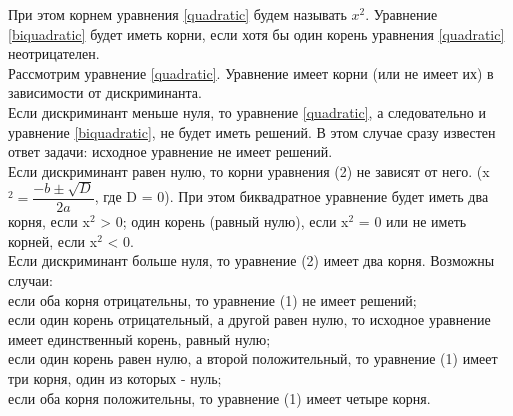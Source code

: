 \documentclass[12pt,a4paper]{report}
\begin{document}
При этом корнем уравнения \ref{quadratic} будем называть $x^{2}$.
Уравнение \ref{biquadratic} будет иметь корни, если хотя бы один корень уравнения \ref{quadratic} неотрицателен. \\
Рассмотрим уравнение \ref{quadratic}. Уравнение имеет корни (или не имеет их) в зависимости от дискриминанта. \\
Если дискриминант меньше нуля, то уравнение \ref{quadratic}, а следовательно и уравнение \ref{biquadratic}, не будет иметь решений. В этом случае сразу известен ответ задачи: исходное уравнение не имеет решений. \\
Если дискриминант равен нулю, то корни уравнения (2) не зависят от него. (x$^{2} = \dfrac{-b \pm \sqrt{D}}{2a}$, где D = 0). При этом биквадратное уравнение будет иметь два корня, если x$^{2}$ > 0; один корень (равный нулю), если x$^{2}$ = 0 или не иметь корней, если x$^{2}$ < 0. \\ 
Если дискриминант больше нуля, то уравнение (2) имеет два корня. Возможны случаи: \\
если оба корня отрицательны, то уравнение (1) не имеет решений; \\
если один корень отрицательный, а другой равен нулю, то исходное уравнение имеет единственный корень, равный нулю; \\
если один корень равен нулю, а второй положительный, то уравнение (1) имеет три корня, один из которых - нуль; \\
если оба корня положительны, то уравнение (1) имеет четыре корня. 
\end{document}
